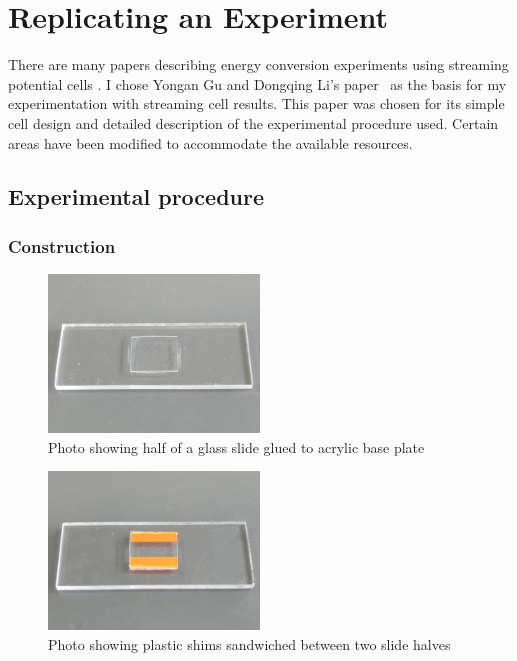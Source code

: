 
\section{Replicating an Experiment}

There are many papers describing energy conversion experiments using streaming potential cells \cite{Gu2000,Mala1997,Scales1992,VanderHeyden2006}.
I chose Yongan Gu and Dongqing Li's paper~\cite{Gu2000} as the basis for my experimentation with streaming cell results.
This paper was chosen for its simple cell design and detailed description of the experimental procedure used.
Certain areas have been modified to accommodate the available resources.


\subsection{\label{sub:Experimental-Procedure}Experimental procedure}


  \subsubsection*{Construction}

    \begin{figure}
      \centering
      \includegraphics[width=0.5\textwidth]{content/pt1/01-PowerHarvesting/graphics/Photo_streamingPotential_Assembly_Step1.JPG}
      \caption{\label{fig:Photo_streamingPotential_Assembly_Step1}Photo showing half of a glass slide glued to acrylic base plate}
    \end{figure}

    \begin{figure}
      \centering
      \includegraphics[width=0.5\textwidth]{content/pt1/01-PowerHarvesting/graphics/Photo_streamingPotential_Assembly_Step2.JPG}
      \caption{\label{Photo_streamingPotential_Assembly_Step2}Photo showing plastic shims sandwiched between two slide halves}
    \end{figure}

